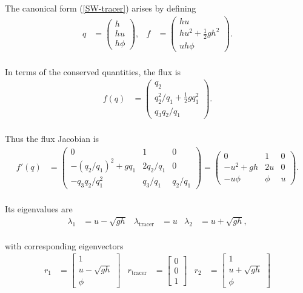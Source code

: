 \documentclass{SIAMbook2016}
\begin{document}
The canonical form (\ref{SW-tracer}) arises by defining \begin{align}
q & = \begin{pmatrix} h \\ hu \\ h \phi \end{pmatrix}, & f & = \begin{pmatrix} hu \\ hu^2 + \frac{1}{2}gh^2 \\ uh\phi\end{pmatrix}.
\end{align}\\
In terms of the conserved quantities, the flux is\\
\begin{align}
f(q) & = \begin{pmatrix} q_2 \\ q_2^2/q_1 + \frac{1}{2}g q_1^2 \\ q_3 q_2/q_1 \end{pmatrix}.
\end{align}\\
Thus the flux Jacobian is\\
\begin{align}
f'(q) & = \begin{pmatrix} 0 & 1 & 0  \\ -(q_2/q_1)^2 + g q_1 & 2 q_2/q_1 & 0 \\ -q_3 q_2/q_1^2 & q_3/q_1 & q_2/q_1 \end{pmatrix} 
        = \begin{pmatrix} 0 & 1 & 0 \\ -u^2 + g h & 2 u & 0 \\ -u\phi & \phi & u \end{pmatrix}.
\end{align}\\
Its eigenvalues are\\
\begin{align*}
    \lambda_1 & = u - \sqrt{gh} & \lambda_\text{tracer} & = u & \lambda_2 & = u + \sqrt{gh},
\end{align*}\\
with corresponding eigenvectors\\
\begin{align*}
    r_1 & = \begin{bmatrix} 1 \\ u-\sqrt{gh} \\ \phi \end{bmatrix} &
    r_\text{tracer} & = \begin{bmatrix} 0 \\ 0 \\ 1 \end{bmatrix} & 
    r_2 & = \begin{bmatrix} 1 \\ u+\sqrt{gh} \\ \phi \end{bmatrix}
\end{align*}\\
\end{document}
